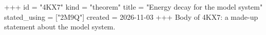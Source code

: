 +++
id = "4KX7"
kind = "theorem"
title = "Energy decay for the model system"
stated_using = ["2M9Q"]
created = 2026-11-03
+++
Body of 4KX7: a made-up statement about the model system.
